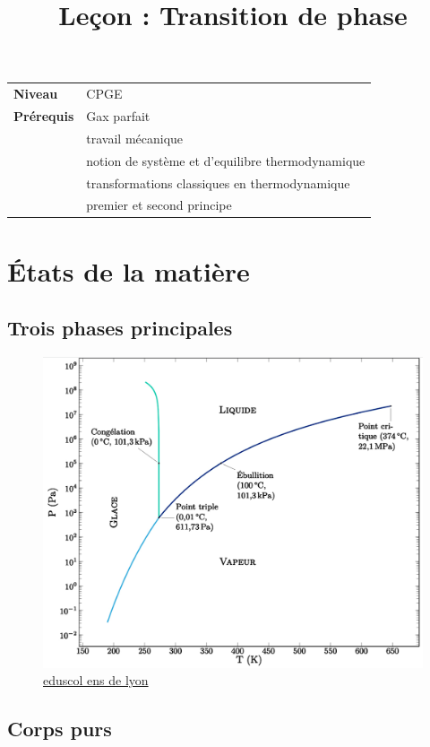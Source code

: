 \documentclass[10pt]{beamer}
\title{Leçon : Transition de phase}
\begin{document}
\begin{frame}{}
    \titlepage

    \begin{tabularx}{\textwidth}{l@{:\,\,}X}
        \textbf{Niveau} 	  & CPGE\\
        \textbf{Prérequis} & Gax parfait\\
        & travail mécanique \\
        & notion de système et d'equilibre thermodynamique \\
        & transformations classiques en thermodynamique \\
        & premier et second principe
    \end{tabularx}
\end{frame}

\begin{frame}
    \tableofcontents
\end{frame}

\section{États de la matière}
\subsection{Trois phases principales}

\begin{frame}{\insertsubsection}
    \begin{figure}
        \centering
        \includegraphics[width= .5\textwidth]{Point_triple_deleau_enslyon.png}
        \caption{\href{https://planet-terre.ens-lyon.fr/ressource/diagramme-lineaire-log.xml}{eduscol ens de lyon}}
    \end{figure}
\end{frame}

\subsection{Corps purs}
\end{document}

